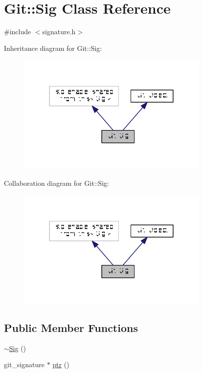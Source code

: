 \hypertarget{class_git_1_1_sig}{\section{Git\-:\-:Sig Class Reference}
\label{class_git_1_1_sig}
}


{\ttfamily \#include $<$signature.\-h$>$}



Inheritance diagram for Git\-:\-:Sig\-:\nopagebreak
\begin{figure}[H]
\begin{center}
\leavevmode
\includegraphics[width=269pt]{class_git_1_1_sig__inherit__graph}
\end{center}
\end{figure}


Collaboration diagram for Git\-:\-:Sig\-:\nopagebreak
\begin{figure}[H]
\begin{center}
\leavevmode
\includegraphics[width=269pt]{class_git_1_1_sig__coll__graph}
\end{center}
\end{figure}
\subsection*{Public Member Functions}
\begin{DoxyCompactItemize}
\item 
\hyperlink{class_git_1_1_sig_abafb1257582300426653b2bb6477bbc2}{$\sim$\-Sig} ()
\item 
git\-\_\-signature $\ast$ \hyperlink{class_git_1_1_sig_aa5f2cf3b7b10a369eb8e62509e4de30e}{ptr} ()
\end{DoxyCompactItemize}
